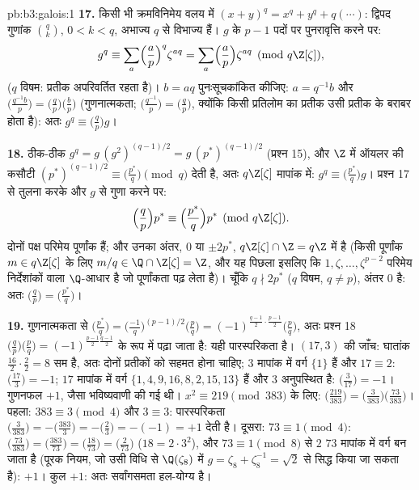 \begin{solution}{pb:b3:galois:1}
\textbf{17.} किसी भी क्रमविनिमेय वलय में $(x + y)^q = x^q + y^q
+ q(\cdots)$: द्विपद गुणांक $\binom qk$,
$0 < k <
q$, अभाज्य $q$ से विभाज्य हैं। $g$ के $p - 1$ पदों पर पुनरावृत्ति
करने पर:
\[
g^q \equiv \sum_{a}\Bigl(\frac ap\Bigr)^{q}\zeta^{aq}
= \sum_a\Bigl(\frac ap\Bigr)\zeta^{aq}
\pmod{q\Z[\zeta]},
\]
($q$ विषम: प्रतीक अपरिवर्तित रहता है)। $b = aq$ पुनःसूचकांकित कीजिए:
$a =
q^{-1}b$ और $\bigl(\frac{q^{-1}b}p\bigr) =
\bigl(\frac{q}p\bigr)\bigl(\frac bp\bigr)$ (गुणनात्मकता; $\bigl(\frac{q^{-1}}p\bigr) = \bigl(\frac qp\bigr)$, क्योंकि किसी प्रतिलोम का प्रतीक
उसी प्रतीक के बराबर होता है): अतः $g^q \equiv
\bigl(\frac qp\bigr)g$।

\textbf{18.} ठीक-ठीक $g^q = g\,(g^2)^{(q-1)/2} = g\,(p^*)^{(q-1)/2}$ (प्रश्न 15), और $\Z$ में ऑयलर की कसौटी
$(p^*)^{(q-1)/2} \equiv \bigl(\frac{p^*}q\bigr) \pmod q$ देती है, अतः $q\Z[\zeta]$ मापांक में: $g^q \equiv \bigl(\frac{p^*}q\bigr)g$। प्रश्न 17 से तुलना करके
और $g$ से गुणा करने पर:
\[
\Bigl(\frac qp\Bigr)p^* \equiv \Bigl(\frac{p^*}q\Bigr)p^*
\pmod{q\Z[\zeta]} .
\]
दोनों पक्ष परिमेय पूर्णांक हैं; और उनका अंतर, $0$ या $\pm2p^*$, $q\Z[\zeta] \cap \Z = q\Z$
में है (किसी पूर्णांक $m
\in q\Z[\zeta]$ के लिए $m/q \in \Q \cap \Z[\zeta] = \Z$, और यह पिछला इसलिए कि
$1, \zeta, \dots, \zeta^{p-2}$ परिमेय निर्देशांकों वाला $\Q$-आधार है जो पूर्णांकता पढ़ लेता
है)। चूँकि $q \nmid 2p^*$ ($q$ विषम, $q \neq p$), अंतर $0$ है: अतः $\bigl(\frac qp\bigr) =
\bigl(\frac{p^*}q\bigr)$।

\textbf{19.} गुणनात्मकता से $\bigl(\frac{p^*}q\bigr) =
\bigl(\frac{-1}q\bigr)^{(p-1)/2}\bigl(\frac pq\bigr) =
(-1)^{\frac{q-1}2\cdot\frac{p-1}2}\bigl(\frac pq\bigr)$, अतः प्रश्न 18 $\bigl(\frac qp\bigr)\bigl(\frac
pq\bigr) = (-1)^{\frac{p-1}2\frac{q-1}2}$ के रूप में
पढ़ा जाता है: यही पारस्परिकता है। $(17, 3)$ की जाँच: घातांक $\frac{16}2\cdot\frac22 = 8$ सम
है, अतः दोनों प्रतीकों को सहमत होना चाहिए; $3$ मापांक में वर्ग
$\{1\}$ हैं और $17 \equiv 2$: $\bigl(\frac{17}3\bigr) = -1$; $17$ मापांक में वर्ग $\{1, 4,
9, 16, 8, 2, 15, 13\}$ हैं और $3$
अनुपस्थित है: $\bigl(\frac3{17}\bigr) = -1$। गुणनफल $+1$, जैसा भविष्यवाणी की गई थी। $x^2
\equiv 219 \pmod{383}$
के लिए: $\bigl(\frac{219}{383}\bigr) =
\bigl(\frac3{383}\bigr)\bigl(\frac{73}{383}\bigr)$। पहला: $383 \equiv 3 \pmod4$ और $3 \equiv 3$: पारस्परिकता $\bigl(\frac3{383}\bigr) = -\bigl(\frac{383}3\bigr) =
-\bigl(\frac23\bigr) = -(-1) = +1$ देती है।
दूसरा: $73 \equiv 1
\pmod 4$: $\bigl(\frac{73}{383}\bigr) =
\bigl(\frac{383}{73}\bigr) = \bigl(\frac{18}{73}\bigr) =
\bigl(\frac2{73}\bigr)$ ($18 = 2\cdot3^2$), और $73 \equiv 1
\pmod 8$ से $2$ $73$ मापांक में
वर्ग बन जाता है (पूरक नियम, जो उसी विधि से $\Q(\zeta_8)$ में $g = \zeta_8 + \zeta_8^{-1} = \sqrt2$ से सिद्ध
किया जा सकता है): $+1$। कुल $+1$: अतः सर्वांगसमता हल-योग्य है।


\end{solution}
